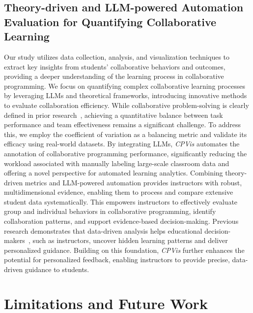 {\subsection{Theory-driven and LLM-powered Automation Evaluation for Quantifying Collaborative Learning}
Our study utilizes data collection, analysis, and visualization techniques to extract key insights from students' collaborative behaviors and outcomes, providing a deeper understanding of the learning process in collaborative programming. We focus on quantifying complex collaborative learning processes by leveraging LLMs and theoretical frameworks, introducing innovative methods to evaluate collaboration efficiency. 
While collaborative problem-solving is clearly defined in prior research~\cite{rosen2020towards}, achieving a quantitative balance between task performance and team effectiveness remains a significant challenge. To address this, we employ the coefficient of variation as a balancing metric and validate its efficacy using real-world datasets.
By integrating LLMs, \textit{CPVis} automates the annotation of collaborative programming performance, significantly reducing the workload associated with manually labeling large-scale classroom data and offering a novel perspective for automated learning analytics. 
Combining theory-driven metrics and LLM-powered automation provides instructors with robust, multidimensional evidence, enabling them to process and compare extensive student data systematically. 
This empowers instructors to effectively evaluate group and individual behaviors in collaborative programming, identify collaboration patterns, and support evidence-based decision-making. Previous research demonstrates that data-driven analysis helps educational decision-makers~\cite{hou2024codetailor}, such as instructors, uncover hidden learning patterns and deliver personalized guidance. Building on this foundation, \textit{CPVis} further enhances the potential for personalized feedback, enabling instructors to provide precise, data-driven guidance to students.


}


\section{Limitations and Future Work}


